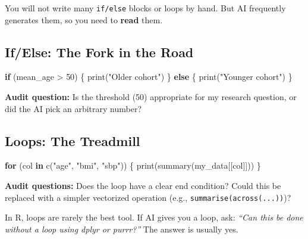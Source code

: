 \documentclass[
  letterpaper,
  DIV=11,
  numbers=noendperiod,
  oneside]{scrreprt}
\newenvironment{Shaded}{\begin{snugshade}}{\end{snugshade}}
\newcommand{\ControlFlowTok}[1]{\textcolor[rgb]{0.00,0.23,0.31}{\textbf{#1}}}
\newcommand{\DecValTok}[1]{\textcolor[rgb]{0.68,0.00,0.00}{#1}}
\newcommand{\FunctionTok}[1]{\textcolor[rgb]{0.28,0.35,0.67}{#1}}
\newcommand{\NormalTok}[1]{\textcolor[rgb]{0.00,0.23,0.31}{#1}}
\newcommand{\SpecialCharTok}[1]{\textcolor[rgb]{0.37,0.37,0.37}{#1}}
\newcommand{\StringTok}[1]{\textcolor[rgb]{0.13,0.47,0.30}{#1}}
\begin{document}

You will not write many \texttt{if/else} blocks or loops by hand. But AI
frequently generates them, so you need to \textbf{read} them.

\subsection*{If/Else: The Fork in the
Road}\label{ifelse-the-fork-in-the-road}

\begin{Shaded}
\begin{Highlighting}[numbers=left,,]
\ControlFlowTok{if}\NormalTok{ (mean\_age }\SpecialCharTok{\textgreater{}} \DecValTok{50}\NormalTok{) \{}
  \FunctionTok{print}\NormalTok{(}\StringTok{"Older cohort"}\NormalTok{)}
\NormalTok{\} }\ControlFlowTok{else}\NormalTok{ \{}
  \FunctionTok{print}\NormalTok{(}\StringTok{"Younger cohort"}\NormalTok{)}
\NormalTok{\}}
\end{Highlighting}
\end{Shaded}

\textbf{Audit question:} Is the threshold (50) appropriate for my
research question, or did the AI pick an arbitrary number?

\subsection*{Loops: The Treadmill}\label{loops-the-treadmill}

\begin{Shaded}
\begin{Highlighting}[numbers=left,,]
\ControlFlowTok{for}\NormalTok{ (col }\ControlFlowTok{in} \FunctionTok{c}\NormalTok{(}\StringTok{"age"}\NormalTok{, }\StringTok{"bmi"}\NormalTok{, }\StringTok{"sbp"}\NormalTok{)) \{}
  \FunctionTok{print}\NormalTok{(}\FunctionTok{summary}\NormalTok{(my\_data[[col]]))}
\NormalTok{\}}
\end{Highlighting}
\end{Shaded}

\textbf{Audit questions:} Does the loop have a clear end condition?
Could this be replaced with a simpler vectorized operation (e.g.,
\texttt{summarise(across(...))})?

\begin{tcolorbox}[enhanced jigsaw, opacitybacktitle=0.6, colbacktitle=quarto-callout-note-color!10!white, breakable, opacityback=0, coltitle=black, toptitle=1mm, bottomrule=.15mm, colframe=quarto-callout-note-color-frame, bottomtitle=1mm, colback=white, leftrule=.75mm, rightrule=.15mm, title=\textcolor{quarto-callout-note-color}{\faInfo}\hspace{0.5em}{Note}, left=2mm, arc=.35mm, toprule=.15mm, titlerule=0mm]

In R, loops are rarely the best tool. If AI gives you a loop, ask:
\emph{``Can this be done without a loop using dplyr or purrr?''} The
answer is usually yes.

\end{tcolorbox}
\end{document}
